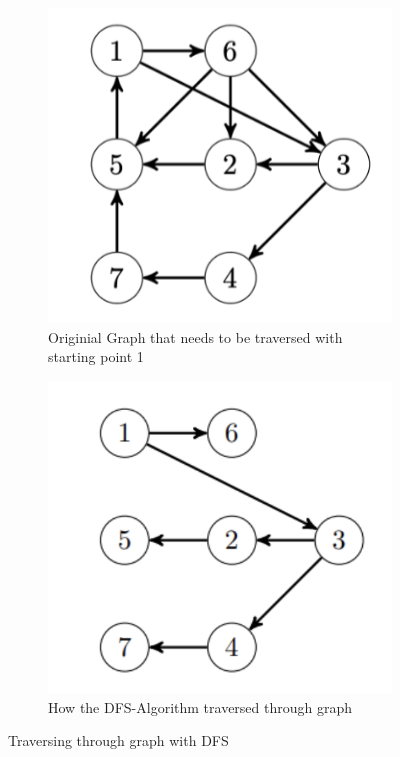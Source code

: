 \documentclass[a4paper]{article}
\begin{document}
\begin{figure}[h]
    \begin{subfigure}{0.4\textwidth}
        \centering
        \includegraphics[scale = 0.4, width=\textwidth]{Pictures/DFS-StartGraph.png}
        \caption{Originial Graph that needs to be traversed with starting point 1}
        \label{fig:DFS-Start}
    \end{subfigure}
    \hfill
    \begin{subfigure}{0.4\textwidth}
        \centering
        \includegraphics[scale= 0.4,  width=\textwidth]{Pictures/DFS-EndGraph.png}
         \caption{How the DFS-Algorithm traversed through graph}
        \label{fig:DFS-End}
    \end{subfigure}
\caption{Traversing through graph with DFS}
\label{fig:DFS-Veranschaulichung}
\end{figure}
\end{document}
